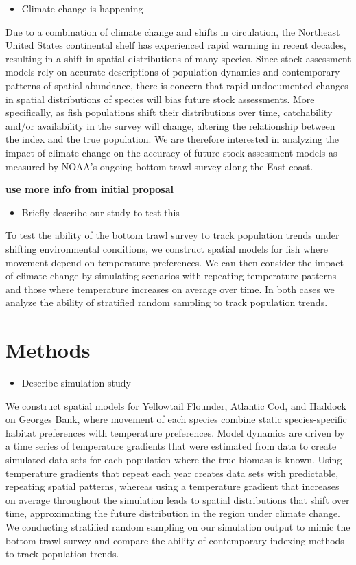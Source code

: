 \documentclass[
  12pt,
]{article}
\providecommand{\tightlist}{%
  \setlength{\itemsep}{0pt}\setlength{\parskip}{0pt}}
\begin{document}
\begin{itemize}
\tightlist
\item
  Climate change is happening
\end{itemize}

Due to a combination of climate change and shifts in circulation, the Northeast United States continental shelf has experienced rapid warming in recent decades, resulting in a shift in spatial distributions of many species. Since stock assessment models rely on accurate descriptions of population dynamics and contemporary patterns of spatial abundance, there is concern that rapid undocumented changes in spatial distributions of species will bias future stock assessments. More specifically, as fish populations shift their distributions over time, catchability and/or availability in the survey will change, altering the relationship between the index and the true population. We are therefore interested in analyzing the impact of climate change on the accuracy of future stock assessment models as measured by NOAA's ongoing bottom-trawl survey along the East coast.

\textbf{use more info from initial proposal}

\begin{itemize}
\tightlist
\item
  Briefly describe our study to test this
\end{itemize}

To test the ability of the bottom trawl survey to track population trends under shifting environmental conditions, we construct spatial models for fish where movement depend on temperature preferences. We can then consider the impact of climate change by simulating scenarios with repeating temperature patterns and those where temperature increases on average over time. In both cases we analyze the ability of stratified random sampling to track population trends.

\section{Methods}

\begin{itemize}
\tightlist
\item
  Describe simulation study
\end{itemize}

We construct spatial models for Yellowtail Flounder, Atlantic Cod, and Haddock on Georges Bank, where movement of each species combine static species-specific habitat preferences with temperature preferences. Model dynamics are driven by a time series of temperature gradients that were estimated from data to create simulated data sets for each population where the true biomass is known. Using temperature gradients that repeat each year creates data sets with predictable, repeating spatial patterns, whereas using a temperature gradient that increases on average throughout the simulation leads to spatial distributions that shift over time, approximating the future distribution in the region under climate change. We conducting stratified random sampling on our simulation output to mimic the bottom trawl survey and compare the ability of contemporary indexing methods to track population trends.
\end{document}
